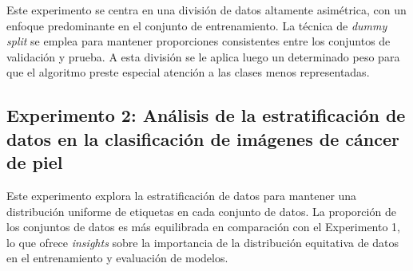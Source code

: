 Este experimento se centra en una división de datos altamente asimétrica, con un enfoque predominante en el conjunto de entrenamiento. La técnica de \textit{dummy split} se emplea para mantener proporciones consistentes entre los conjuntos de validación y prueba. A esta división se le aplica luego un determinado peso para que el algoritmo preste especial atención a las clases menos representadas.

\subsection{Experimento 2: Análisis de la estratificación de datos en la clasificación de imágenes de cáncer de piel}

Este experimento explora la estratificación de datos para mantener una distribución uniforme de etiquetas en cada conjunto de datos. La proporción de los conjuntos de datos es más equilibrada en comparación con el Experimento 1, lo que ofrece \textit{insights} sobre la importancia de la distribución equitativa de datos en el entrenamiento y evaluación de modelos.